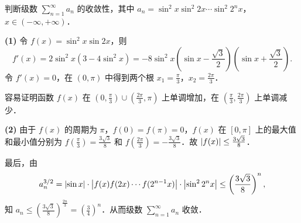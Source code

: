 判断级数 $\displaystyle \sum_{n=1}^{\infty}a_n$ 的收敛性，其中 $a_n=\sin^2 x\sin^2 2x\cdots\sin^2 2^n x$，$x\in(-\infty,+\infty)$．
\begin{solution}
  \textbf{(1)} 令 $f(x)=\sin^2 x\sin 2x$，则
  \[
    f'(x)=2\sin^2 x(3-4\sin^2 x)
    =-8\sin^2 x\left(\sin x-\frac{\sqrt{3}}{2}\right)\left(\sin x+\frac{\sqrt{3}}{2}\right).
  \]
  令 $f'(x)=0$，在 $(0,\pi)$ 中得到两个根 $x_1=\frac{\pi}{3}$，$x_2=\frac{2\pi}{3}$．

  容易证明函数 $f(x)$ 在 $\left(0,\frac{\pi}{3}\right)\cup\left(\frac{2\pi}{3},\pi\right)$ 上单调增加，在 $\left(\frac{\pi}{3},\frac{2\pi}{3}\right)$ 上单调减少．

  \textbf{(2)} 由于 $f(x)$ 的周期为 $\pi$，$f(0)=f(\pi)=0$，$f(x)$ 在 $[0,\pi]$ 上的最大值和最小值分别为 $f\left(\frac{\pi}{3}\right)=\frac{3\sqrt{3}}{8}$ 和 $f\left(\frac{2\pi}{3}\right)=-\frac{3\sqrt{3}}{8}$．故 $\left|f(x)\right|\le\frac{3\sqrt{3}}{8}$．

  最后，由
  \[
    a_n^{3/2}=\left|\sin x\right|\cdot\left|f(x)f(2x)\cdots f(2^{n-1}x)\right|\cdot\left|\sin^2 2^n x\right|
    \le\left(\frac{3\sqrt{3}}{8}\right)^n,
  \]
  知 $a_n\le\left(\frac{3\sqrt{3}}{8}\right)^{\frac{2n}{3}}=\left(\frac{3}{4}\right)^n$．从而级数 $\displaystyle \sum_{n=1}^{\infty}a_n$ 收敛．
\end{solution}

